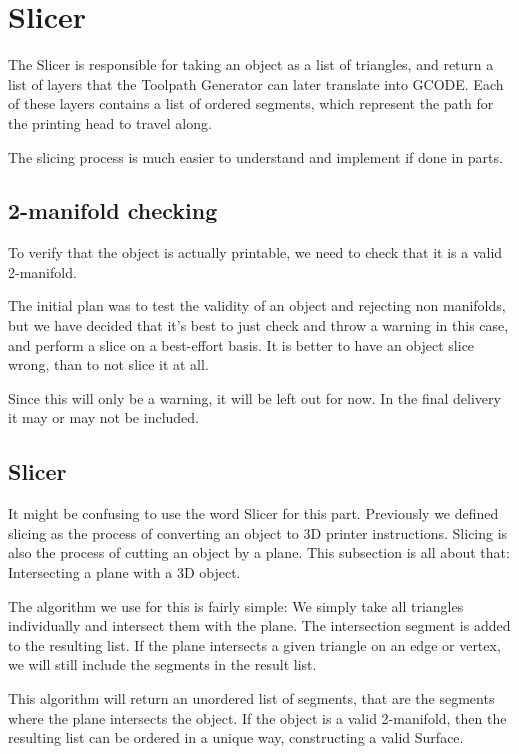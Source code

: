 \pagebreak

\section{Slicer}
The Slicer is responsible for taking an object as a list of triangles, and return a list of layers that the Toolpath Generator can later translate into GCODE. Each of these layers contains a list of ordered segments, which represent the path for the printing head to travel along.

The slicing process is much easier to understand and implement if done in parts.

\subsection{2-manifold checking}
To verify that the object is actually printable, we need to check that it is a valid 2-manifold. 

The initial plan was to test the validity of an object and rejecting non manifolds, but we have decided that it's best to just check and throw a warning in this case, and perform a slice on a best-effort basis. It is better to have an object slice wrong, than to not slice it at all.

Since this will only be a warning, it will be left out for now. In the final delivery it may or may not be included.

\subsection{Slicer}

It might be confusing to use the word Slicer for this part. Previously we defined slicing as the process of converting an object to 3D printer instructions. Slicing is also the process of cutting an object by a plane. This subsection is all about that: Intersecting a plane with a 3D object.

The algorithm we use for this is fairly simple: We simply take all triangles individually and intersect them with the plane. The intersection segment is added to the resulting list. If the plane intersects a given triangle on an edge or vertex, we will still include the segments in the result list. 

This algorithm will return an unordered list of segments, that are the segments where the plane intersects the object. If the object is a valid 2-manifold, then the resulting list can be ordered in a unique way, constructing a valid Surface.


